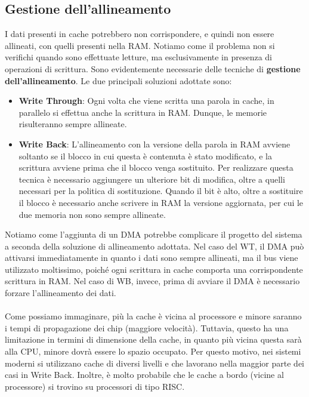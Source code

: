 \subsection{Gestione dell'allineamento}
I dati presenti in cache potrebbero non corrispondere, e quindi non essere allineati, con quelli presenti nella RAM. Notiamo come il problema non si verifichi quando sono effettuate letture, ma esclusivamente in presenza di operazioni di scrittura. Sono evidentemente necessarie delle tecniche di \textbf{gestione dell'allineamento}. Le due principali soluzioni adottate sono:
\begin{itemize}
    \item \textbf{Write Through}: Ogni volta che viene scritta una parola in cache, in parallelo si effettua anche la scrittura in RAM. Dunque, le memorie risulteranno sempre allineate.
    \item \textbf{Write Back}: L'allineamento con la versione della parola in RAM avviene soltanto se il blocco in cui questa è contenuta è stato modificato, e la scrittura avviene prima che il blocco venga sostituito. Per realizzare questa tecnica è necessario aggiungere un ulteriore bit di modifica, oltre a quelli necessari per la politica di sostituzione. Quando il bit è alto, oltre a sostituire il blocco è necessario anche scrivere in RAM la versione aggiornata, per cui le due memoria non sono sempre allineate.
\end{itemize}

Notiamo come l'aggiunta di un DMA potrebbe complicare il progetto del sistema a seconda della soluzione di allineamento adottata. Nel caso del WT, il DMA può attivarsi immediatamente in quanto i dati sono sempre allineati, ma il bus viene utilizzato moltissimo, poiché ogni scrittura in cache comporta una corrispondente scrittura in RAM. Nel caso di WB, invece, prima di avviare il DMA è necessario forzare l'allineamento dei dati. 
\\
\\
Come possiamo immaginare, più la cache è vicina al processore e minore saranno i tempi di propagazione dei chip (maggiore velocità). Tuttavia, questo ha una limitazione in termini di dimensione della cache, in quanto più vicina questa sarà alla CPU, minore dovrà essere lo spazio occupato. Per questo motivo, nei sistemi moderni si utilizzano cache di diversi livelli e che lavorano nella maggior parte dei casi in Write Back. Inoltre, è molto probabile che le cache a bordo (vicine al processore) si trovino su processori di tipo RISC.

